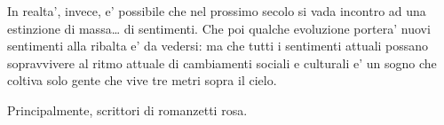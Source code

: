 \documentclass[dvipsnames]{amsart}
\begin{document}
  In realta’, invece, e’ possibile che nel prossimo secolo si vada incontro ad una estinzione di massa… di sentimenti. Che poi qualche evoluzione portera’ nuovi sentimenti alla ribalta e’ da vedersi: ma che tutti i sentimenti attuali possano sopravvivere al ritmo attuale di cambiamenti sociali e culturali e’ un sogno che coltiva solo gente che vive tre metri sopra il cielo.
  
  Principalmente, scrittori di romanzetti rosa.  



\end{document}
